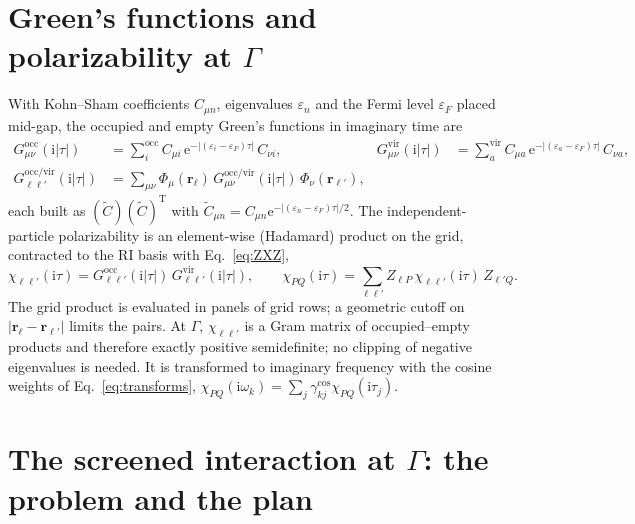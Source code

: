 \documentclass[11pt,a4paper]{article}
\newcommand{\br}{\mathbf{r}}
\newcommand{\ii}{\mathrm{i}}
\newcommand{\ee}{\mathrm{e}}
\newcommand{\Tr}{\mathrm{T}}
\newcommand{\occ}{\mathrm{occ}}
\newcommand{\vir}{\mathrm{vir}}
\begin{document}
\section{Green's functions and polarizability at $\Gamma$}

With Kohn--Sham coefficients $C_{\mu n}$, eigenvalues $\varepsilon_n$ and the Fermi level
$\varepsilon_F$ placed mid-gap, the occupied and empty Green's functions in imaginary time are
\begin{align}
  G^\occ_{\mu\nu}(\ii|\tau|) &= \sum_{i}^{\occ} C_{\mu i}\,\ee^{-|(\varepsilon_i-\varepsilon_F)\tau|}\,C_{\nu i},&
  G^\vir_{\mu\nu}(\ii|\tau|) &= \sum_{a}^{\vir} C_{\mu a}\,\ee^{-|(\varepsilon_a-\varepsilon_F)\tau|}\,C_{\nu a},
  \label{eq:G_ao}\\
  G^{\occ/\vir}_{\ell\ell'}(\ii|\tau|) &= \sum_{\mu\nu}\Phi_\mu(\br_\ell)\, G^{\occ/\vir}_{\mu\nu}(\ii|\tau|)\,\Phi_\nu(\br_{\ell'}),
  \label{eq:G_grid}
\end{align}
each built as $(\tilde C)(\tilde C)^\Tr$ with $\tilde C_{\mu n} = C_{\mu n}\ee^{-|(\varepsilon_n-\varepsilon_F)\tau|/2}$.
The independent-particle polarizability is an element-wise (Hadamard) product on the grid,
contracted to the RI basis with Eq.~\eqref{eq:ZXZ},
\begin{equation}
  \chi_{\ell\ell'}(\ii\tau) = G^\occ_{\ell\ell'}(\ii|\tau|)\,G^\vir_{\ell\ell'}(\ii|\tau|),\qquad
  \chi_{PQ}(\ii\tau) = \sum_{\ell\ell'} Z_{\ell P}\,\chi_{\ell\ell'}(\ii\tau)\,Z_{\ell'Q}.
  \label{eq:chi}
\end{equation}
The grid product is evaluated in panels of grid rows; a geometric cutoff on $|\br_\ell-\br_{\ell'}|$
limits the pairs. At $\Gamma$, $\chi_{\ell\ell'}$ is a Gram matrix of occupied--empty products
and therefore exactly positive semidefinite; no clipping of negative eigenvalues is needed. It is
transformed to imaginary frequency with the cosine weights of Eq.~\eqref{eq:transforms},
$\chi_{PQ}(\ii\omega_k) = \sum_j\gamma^{\cos}_{kj}\chi_{PQ}(\ii\tau_j)$.

\section{The screened interaction at $\Gamma$: the problem and the plan}
\end{document}
